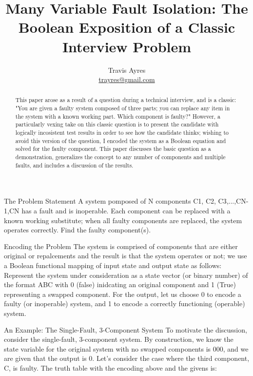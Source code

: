 \documentclass{article}
\begin{document}
\title{Many Variable Fault Isolation: The Boolean Exposition of a Classic Interview Problem}
\author{Travis Ayres \\  \href{mailto:trayres@gmail.com}{trayres@gmail.com}}

\maketitle

\begin{abstract}
	This paper arose as a result of a question during a technical interview, and is a classic: "You are given a faulty system composed of three parts; you can replace any item in the system with a known working part. Which component is faulty?" However, a particularly vexing take on this classic question is to present the candidate with logically incosistent test results in order to see how the candidate thinks; wishing to avoid this version of the question, I encoded the system as a Boolean equation and solved for the faulty component. This paper discusses the basic question as a demonstration,  generalizes the concept to any number of components and multiple faults, and includes a discussion of the results. 
\end{abstract}

The Problem Statement
A system pomposed of N components C1, C2, C3,...,CN-1,CN has a fault and is inoperable. Each component can be replaced with a known working substitute; when all faulty components are replaced, the system operates correctly. Find the faulty component(s).

Encoding the Problem
The system is comprised of components that are either original or repalcements and the result is that the system operates or not; we use a Boolean functional mapping of input state and output state as follows:
Represent the system under consideration as a state vector (or binary number) of the format ABC with 0 (false) inidcating an original component and 1 (True) representing a swapped component. For the output, let us choose 0 to encode a faulty (or inoperable) system, and 1 to encode a correctly functioning (operable) system. 

An Example: The Single-Fault, 3-Component System
To motivate the discussion, consider the single-fault, 3-component system. By construction, we know the state variable for the original system with no swapped components is 000, and we are given that the output is 0. Let's consider the case where the third component, C, is faulty. The truth table with the encoding above and the givens is:
\end{document}
